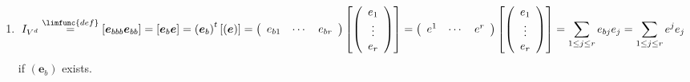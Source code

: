 \documentclass[aps,preprint]{revtex4}
\begin{document}
\begin{enumerate}
\begin{enumerate}
\item 
\begin{equation}
I_{V^{d}}\overset{\limfunc{def}}{=}\left[ \boldsymbol{e}_{bbb}\boldsymbol{e}%
_{bb}\right] =\left[ \boldsymbol{e}_{b}\boldsymbol{e}\right] =\left( 
\boldsymbol{e}_{b}\right) ^{t}\left[ \left( \boldsymbol{e}\right) \right]
=\left( 
\begin{array}{ccc}
e_{b1} & \cdots & e_{br}%
\end{array}%
\right) \left[ \left( 
\begin{array}{c}
e_{1} \\ 
\vdots \\ 
e_{r}%
\end{array}%
\right) \right] =\left( 
\begin{array}{ccc}
e^{1} & \cdots & e^{r}%
\end{array}%
\right) \left[ \left( 
\begin{array}{c}
e_{1} \\ 
\vdots \\ 
e_{r}%
\end{array}%
\right) \right] =\sum_{1\leq j\leq r}e_{bj}e_{j}=\sum_{1\leq j\leq
r}e^{j}e_{j}
\end{equation}%
if $\left( \boldsymbol{e}_{b}\right) $ exists.
\end{enumerate}
\end{enumerate}
\end{document}
